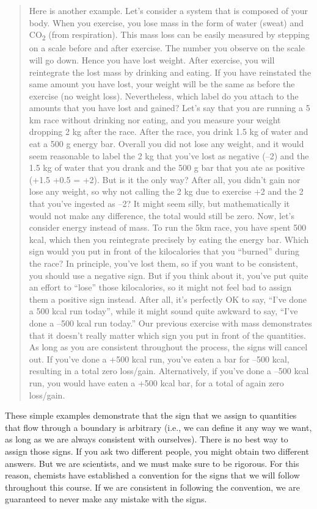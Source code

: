 \documentclass[
  9pt,
]{extbook}
\theoremstyle{definition}
\theoremstyle{definition}
\theoremstyle{definition}
\theoremstyle{definition}
\theoremstyle{remark}
\begin{document}
\begin{quote}
Here is another example. Let's consider a system that is composed of your body. When you exercise, you lose mass in the form of water (sweat) and CO\textsubscript{2} (from respiration). This mass loss can be easily measured by stepping on a scale before and after exercise. The number you observe on the scale will go down. Hence you have lost weight. After exercise, you will reintegrate the lost mass by drinking and eating. If you have reinstated the same amount you have lost, your weight will be the same as before the exercise (no weight loss). Nevertheless, which label do you attach to the amounts that you have lost and gained? Let's say that you are running a 5 km race without drinking nor eating, and you measure your weight dropping 2 kg after the race. After the race, you drink 1.5 kg of water and eat a 500 g energy bar. Overall you did not lose any weight, and it would seem reasonable to label the 2 kg that you've lost as negative (--2) and the 1.5 kg of water that you drank and the 500 g bar that you ate as positive (+1.5 +0.5 = +2). But is it the only way? After all, you didn't gain nor lose any weight, so why not calling the 2 kg due to exercise +2 and the 2 that you've ingested as --2? It might seem silly, but mathematically it would not make any difference, the total would still be zero. Now, let's consider energy instead of mass. To run the 5km race, you have spent 500 kcal, which then you reintegrate precisely by eating the energy bar. Which sign would you put in front of the kilocalories that you ``burned'' during the race? In principle, you've lost them, so if you want to be consistent, you should use a negative sign. But if you think about it, you've put quite an effort to ``lose'' those kilocalories, so it might not feel bad to assign them a positive sign instead. After all, it's perfectly OK to say, ``I've done a 500 kcal run today'', while it might sound quite awkward to say, ``I've done a --500 kcal run today.'' Our previous exercise with mass demonstrates that it doesn't really matter which sign you put in front of the quantities. As long as you are consistent throughout the process, the signs will cancel out. If you've done a +500 kcal run, you've eaten a bar for --500 kcal, resulting in a total zero loss/gain. Alternatively, if you've done a --500 kcal run, you would have eaten a +500 kcal bar, for a total of again zero loss/gain.
\end{quote}

These simple examples demonstrate that the sign that we assign to quantities that flow through a boundary is arbitrary (i.e., we can define it any way we want, as long as we are always consistent with ourselves). There is no best way to assign those signs. If you ask two different people, you might obtain two different answers. But we are scientists, and we must make sure to be rigorous. For this reason, chemists have established a convention for the signs that we will follow throughout this course. If we are consistent in following the convention, we are guaranteed to never make any mistake with the signs.
\end{document}
